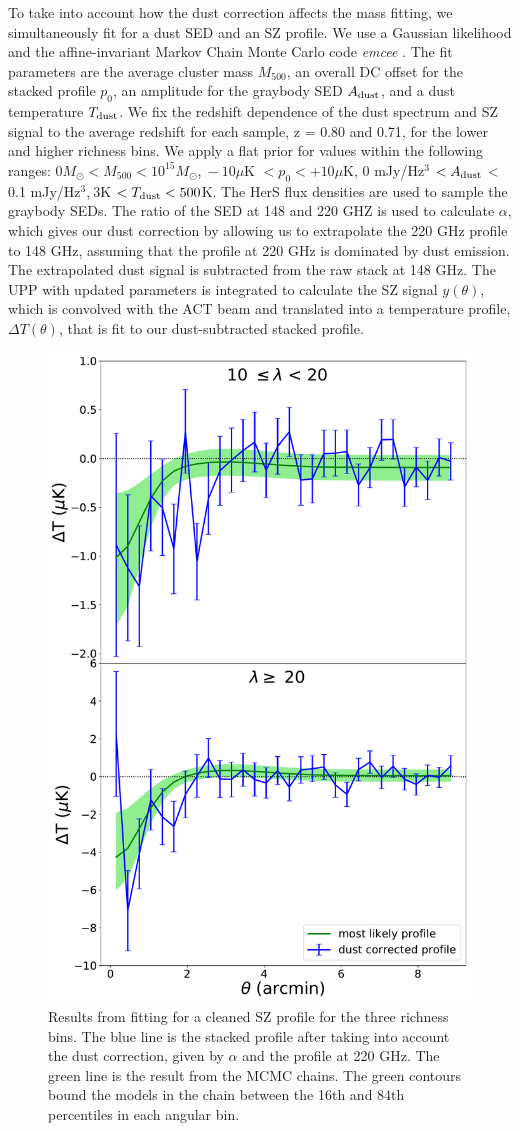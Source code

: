 \documentclass[a4paper,fleqn,usenatbib]{mnras}
\begin{document}
To take into account how the dust correction affects the mass fitting, we simultaneously fit for a dust SED and an SZ profile. We use a Gaussian likelihood and the affine-invariant Markov Chain Monte Carlo code \textit{emcee} \citep{2013PASP..125..306F}. The fit parameters are the average cluster mass $M_{500}$, an overall DC offset for the stacked profile $p_0$, an amplitude for the graybody SED $A_{\rm dust}$, and a dust temperature $T_{\rm dust}$. We fix the redshift dependence of the dust spectrum and SZ signal to the average redshift for each sample, z = 0.80 and 0.71, for the lower and higher richness bins. We apply a flat prior for values within the following ranges: $0 M_{\odot} <  M_{500} < 10^{15} M_{\odot}$,$\ -10 \mu$K $< p_0 < +10 \mu$K, 0 mJy/Hz$^3$ $< A_{\rm dust}$ < 0.1 mJy/Hz$^3$,$\ 3 $K $< T_{\rm dust} < 500$K. 
The HerS flux densities are used to sample the graybody SEDs. The ratio of the SED at 148 and 220 GHZ is used to calculate $\alpha$, which gives our dust correction by allowing us to extrapolate the 220 GHz profile to 148 GHz, assuming that the profile at 220 GHz is dominated by dust emission. The extrapolated dust signal is subtracted from the raw stack at 148 GHz.
The UPP with updated parameters is integrated to calculate the SZ signal $y(\theta)$, which is convolved with the ACT beam and translated into a temperature profile, $\Delta T(\theta)$, that is fit to our dust-subtracted stacked profile. 


\begin{figure}
  \centering
  \includegraphics[width=0.5 \textwidth]{MLprof_ncut_all.pdf}
  \caption{Results from fitting for a cleaned SZ profile for the three richness bins. The blue line is the stacked profile after taking into account the dust correction, given by $\alpha$ and the profile at 220 GHz. The green line is the result from the MCMC chains. The green contours bound the models in the chain between the 16th and 84th percentiles in each angular bin.}
  \label{fig:mcmcprof}
\end{figure}
\end{document}
